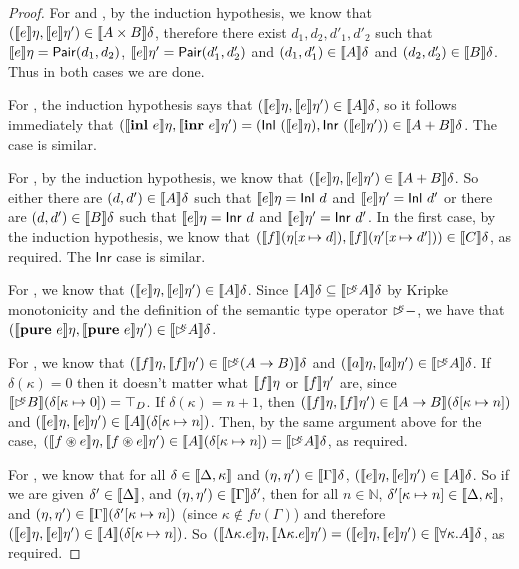 \begin{proof}
  For  and , by the induction hypothesis, we
  know that $(\llbracket e \rrbracket\eta, \llbracket e \rrbracket\eta') \in \llbracket A \times B \rrbracket\delta$,
  therefore there exist $d_1,d_2,d'_1,d'_2$ such that $\llbracket e \rrbracket\eta =
  \mathsf{Pair}(d_1, d_2)$, $\llbracket e \rrbracket\eta' =
  \mathsf{Pair}(d'_1,d'_2)$ and $(d_1,d'_1) \in \llbracket A \rrbracket\delta$ and
  $(d_2,d'_2) \in \llbracket B \rrbracket\delta$. Thus in both cases we are done.

  For , the induction hypothesis says that $(\llbracket e \rrbracket\eta,
  \llbracket e \rrbracket\eta') \in \llbracket A \rrbracket\delta$, so it follows immediately that
  $(\sem{\kw{inl}\ e}\eta, \sem{\kw{inr}\ e}\eta') = (\semCons{Inl}\
  (\sem{e}\eta), \semCons{Inr}\ (\sem{e}\eta')) \in \sem{A +
    B}\delta$. The  case is similar.

  For , by the induction hypothesis, we know that
  $(\llbracket e \rrbracket\eta, \llbracket e \rrbracket\eta') \in \llbracket A + B \rrbracket\delta$. So either there
  are $(d,d') \in \llbracket A \rrbracket\delta$ such that $\llbracket e \rrbracket\eta =
  \mathsf{Inl}\ d$ and $\llbracket e \rrbracket\eta' = \mathsf{Inl}\ d'$ or there
  are $(d,d') \in \llbracket B \rrbracket\delta$ such that $\llbracket e \rrbracket\eta =
  \mathsf{Inr}\ d$ and $\llbracket e \rrbracket\eta' = \mathsf{Inr}\ d'$. In the
  first case, by the induction hypothesis, we know that
  $(\llbracket f \rrbracket(\eta[\textit{x} \mapsto d]), \llbracket f \rrbracket(\eta'[\textit{x}
  \mapsto d'])) \in \llbracket C \rrbracket\delta$, as required. The $\mathsf{Inr}$
  case is similar.

  For , we know that $(\llbracket e \rrbracket\eta, \llbracket e \rrbracket\eta') \in
  \llbracket A \rrbracket\delta$. Since $\llbracket A \rrbracket\delta \subseteq \llbracket \mathord{\rhd\kern-0.4em^{\kappa}}
    A \rrbracket\delta$ by Kripke monotonicity and the definition of the
  semantic type operator $\mathord{\rhd\kern-0.4em^{\kappa}}-$, we have that
  $(\llbracket \textbf{pure}\ e \rrbracket\eta, \llbracket \textbf{pure}\ e \rrbracket\eta') \in
  \llbracket \mathord{\rhd\kern-0.4em^{\kappa}} A \rrbracket\delta$.

  For , we know that $(\llbracket f \rrbracket\eta,\llbracket f \rrbracket\eta') \in
  \llbracket \mathord{\rhd\kern-0.4em^{\kappa}}(A \to B) \rrbracket\delta$ and $(\llbracket a \rrbracket\eta,\llbracket a \rrbracket\eta')
  \in \llbracket \mathord{\rhd\kern-0.4em^{\kappa}} A \rrbracket\delta$. If $\delta(\kappa) = 0$ then it
  doesn't matter what $\llbracket f \rrbracket\eta$ or $\llbracket f \rrbracket\eta'$ are, since
  $\llbracket \mathord{\rhd\kern-0.4em^{\kappa}} B \rrbracket(\delta[\kappa\mapsto 0]) = \top_D$. If
  $\delta(\kappa) = n + 1$, then $(\llbracket f \rrbracket\eta, \llbracket f \rrbracket\eta') \in
  \llbracket A \to B \rrbracket(\delta[\kappa \mapsto n])$ and $(\llbracket e \rrbracket\eta,
  \llbracket e \rrbracket\eta') \in \llbracket A \rrbracket(\delta[\kappa \mapsto n])$. Then, by the
  same argument above for the \TirName{App} case, $(\llbracket f \circledast
    e \rrbracket\eta, \llbracket f \circledast e \rrbracket\eta') \in \llbracket A \rrbracket(\delta[\kappa
  \mapsto n]) = \llbracket \mathord{\rhd\kern-0.4em^{\kappa}} A \rrbracket\delta$, as required.

  For , we know that for all $\delta \in
  \llbracket \Delta, \kappa \rrbracket$ and $(\eta,\eta') \in \llbracket \Gamma \rrbracket\delta$,
  $(\llbracket e \rrbracket\eta, \llbracket e \rrbracket\eta') \in \llbracket A \rrbracket\delta$. So if we are given
  $\delta' \in \llbracket \Delta \rrbracket$, and $(\eta, \eta') \in
  \llbracket \Gamma \rrbracket\delta'$, then for all $n \in \mathbb{N}$,
  $\delta'[\kappa \mapsto n] \in \llbracket \Delta, \kappa \rrbracket$, and
  $(\eta,\eta') \in \llbracket \Gamma \rrbracket(\delta'[\kappa \mapsto n])$ (since
  $\kappa \not\in \mathit{fv}(\Gamma)$) and therefore $(\llbracket e \rrbracket\eta,
  \llbracket e \rrbracket\eta') \in \llbracket A \rrbracket(\delta[\kappa \mapsto n])$. So
  $(\llbracket \Lambda \kappa. e \rrbracket\eta, \llbracket \Lambda \kappa. e \rrbracket\eta') =
  (\llbracket e \rrbracket\eta, \llbracket e \rrbracket\eta') \in \llbracket \forall \kappa.A \rrbracket\delta$, as
  required.


\end{proof}
